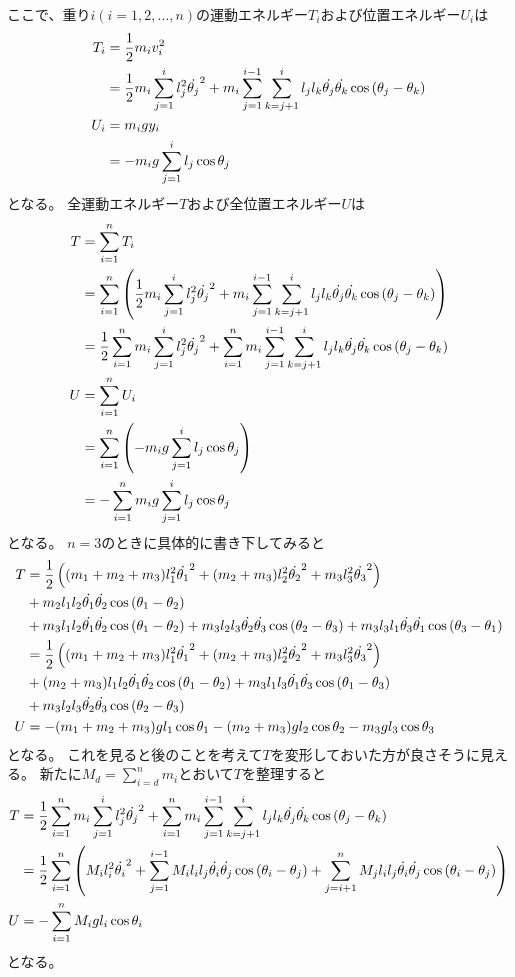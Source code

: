 \documentclass{jsarticle}
\newcommand{\eqa}[1]{\begin{align}#1\end{align}}
\newcommand{\cost}[2]{\cos\left(\theta_{#1}-\theta_{#2}\right)}
\newcommand{\dott}[1]{\dot{\theta_{#1}}}
\begin{document}
ここで、重り$i(i=1,2,\dots,n)$の運動エネルギー$T_i$および位置エネルギー$U_i$は
\eqa{
	T_i &= \frac{1}{2} m_i v_i^2 \notag\\
		&= \frac{1}{2} m_i\sum_{j=1}^i l_j^2 \dott{j}^2
			+ m_i\sum_{j=1}^{i-1} \sum_{k=j+1}^i l_j l_k \dott{j} \dott{k} \cost{j}{k} \\
	U_i &= m_i g y_i \notag\\
		&= -m_i g \sum_{j=1}^i l_j \cos\theta_j
}
となる。
全運動エネルギー$T$および全位置エネルギー$U$は
\eqa{
	T &= \sum_{i=1}^n T_i \notag\\
		&= \sum_{i=1}^n \left( \frac{1}{2} m_i\sum_{j=1}^i l_j^2 \dott{j}^2
			+ m_i\sum_{j=1}^{i-1} \sum_{k=j+1}^i l_j l_k \dott{j} \dott{k} \cost{j}{k} \right) \notag\\
		&= \frac{1}{2} \sum_{i=1}^n m_i \sum_{j=1}^i l_j^2 \dott{j}^2
			+ \sum_{i=1}^n m_i \sum_{j=1}^{i-1} \sum_{k=j+1}^i l_j l_k \dott{j} \dott{k} \cost{j}{k} \notag\\
	U &= \sum_{i=1}^n U_i \notag\\
		&= \sum_{i=1}^n \left(-m_i g \sum_{j=1}^i l_j \cos\theta_j \right) \notag\\
		&= - \sum_{i=1}^n m_i g \sum_{j=1}^i l_j \cos\theta_j
}
となる。
$n=3$のときに具体的に書き下してみると
\eqa{
	T &= \frac{1}{2} \left( (m_1 + m_2 + m_3) l_1^2 \dott{1}^2 + (m_2 + m_3) l_2^2 \dott{2}^2 + m_3 l_3^2 \dott{3}^2 \right) \notag\\
		&+ m_2 l_1 l_2 \dott{1} \dott{2} \cost{1}{2} \notag\\
		&+ m_3 l_1 l_2 \dott{1} \dott{2} \cost{1}{2} + m_3 l_2 l_3 \dott{2} \dott{3} \cost{2}{3} + m_3 l_3 l_1 \dott{3} \dott{1} \cost{3}{1} \notag\\
		&= \frac{1}{2} \left( (m_1 + m_2 + m_3) l_1^2 \dott{1}^2 + (m_2 + m_3) l_2^2 \dott{2}^2 + m_3 l_3^2 \dott{3}^2 \right) \notag\\
		&+ (m_2 + m_3) l_1 l_2 \dott{1} \dott{2} \cost{1}{2} + m_3 l_1 l_3 \dott{1} \dott{3} \cost{1}{3} \notag\\
		&+ m_3 l_2 l_3 \dott{2} \dott{3} \cost{2}{3} \notag\\
	U &= -(m_1 + m_2 + m_3) g l_1 \cos\theta_1 - (m_2 + m_3) g l_2 \cos\theta_2 - m_3 g l_3 \cos\theta_3 \notag
}
となる。
これを見ると後のことを考えて$T$を変形しておいた方が良さそうに見える。
新たに$M_d = \sum_{i=d}^n m_i$とおいて$T$を整理すると
\eqa{
	T &= \frac{1}{2} \sum_{i=1}^n m_i \sum_{j=1}^i l_j^2 \dott{j}^2
			+ \sum_{i=1}^n m_i \sum_{j=1}^{i-1} \sum_{k=j+1}^i l_j l_k \dott{j} \dott{k} \cost{j}{k} \notag\\
		&= \frac{1}{2} \sum_{i=1}^n \left(
			M_i l_i^2 \dott{i}^2
			+ \sum_{j=1}^{i-1} M_i l_i l_j \dott{i} \dott{j} \cost{i}{j}
			+ \sum_{j=i+1}^n M_j l_i l_j \dott{i} \dott{j} \cost{i}{j}
		\right) \\
	U &= -\sum_{i=1}^n M_i g l_i \cos\theta_i
}
となる。
\end{document}
